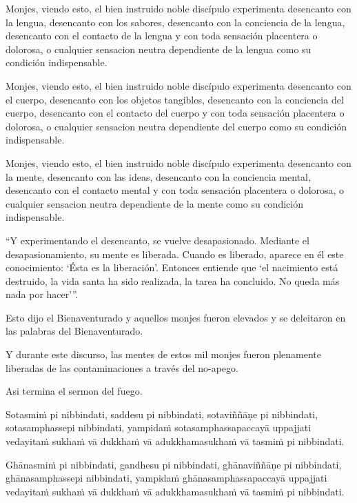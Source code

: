 Monjes, viendo esto, el bien instruido noble discípulo experimenta desencanto con la lengua, desencanto con los sabores, desencanto con la conciencia de la lengua, desencanto con el contacto de la lengua y con toda sensación placentera o dolorosa, o cualquier sensacion neutra dependiente de la lengua como su condición indispensable.

Monjes, viendo esto, el bien instruido noble discípulo experimenta desencanto con el cuerpo, desencanto con los objetos tangibles, desencanto con la conciencia del cuerpo, desencanto con el contacto del cuerpo y con toda sensación placentera o dolorosa, o cualquier sensacion neutra dependiente del cuerpo como su condición indispensable.


Monjes, viendo esto, el bien instruido noble discípulo experimenta desencanto con la mente, desencanto con las ideas, desencanto con la conciencia mental, desencanto con el contacto mental y con toda sensación placentera o dolorosa, o cualquier sensacion neutra dependiente de la mente como su condición indispensable.

“Y experimentando el desencanto, se vuelve desapasionado. Mediante el desapasionamiento, su mente es liberada. Cuando es liberado, aparece en él este conocimiento: ‘Ésta es la liberación’. Entonces entiende que ‘el nacimiento está destruido, la vida santa ha sido realizada, la tarea ha concluido. No queda más nada por hacer’”.

\enlargethispage{\baselineskip}

Esto dijo el Bienaventurado y aquellos monjes fueron elevados y se deleitaron en las palabras del Bienaventurado.

Y durante este discurso, las mentes de estos mil monjes fueron plenamente liberadas de las contaminaciones a través del no-apego.


Asi termina el sermon del fuego.

\clearpage

\paliText
\markboth{\paliTitle}{\rightmark}

Sotasmiṁ pi nibbindati, saddesu pi nibbindati, sotaviññāṇe pi
nibbindati, sotasamphassepi nibbindati, yampidaṁ sotasamphassapaccayā
uppajjati vedayitaṁ sukhaṁ vā dukkhaṁ vā adukkhamasukhaṁ vā tasmiṁ pi
nibbindati.

Ghānasmiṁ pi nibbindati, gandhesu pi nibbindati, ghānaviññāṇe pi
nibbindati, ghānasamphassepi nibbindati, yampidaṁ ghānasamphassapaccayā
uppajjati vedayitaṁ sukhaṁ vā dukkhaṁ vā adukkhamasukhaṁ vā tasmiṁ pi
nibbindati.

